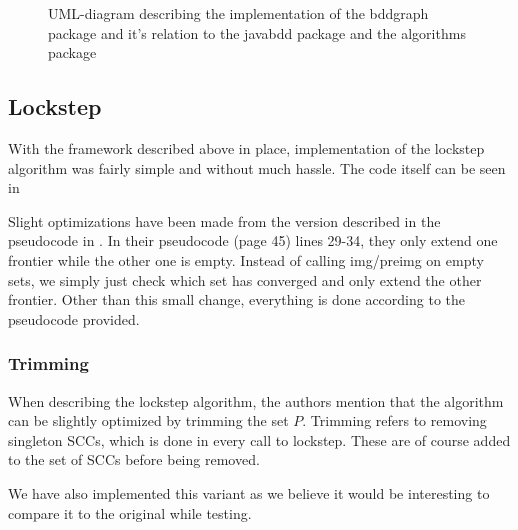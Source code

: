 \documentclass[../master/master.tex]{subfiles}
\begin{document}
\begin{figure}[h!]
\begin{center}
\end{center}
\caption{UML-diagram describing the implementation of the bddgraph package and it's relation to the javabdd package and the algorithms package}
\label{main_uml}
\end{figure}

\subsection{Lockstep}
With the framework described above in place, implementation of the lockstep algorithm was fairly simple and without much hassle. The code itself can be seen in 

Slight optimizations have been made from the version described in the pseudocode in \cite{lockstep}. In their pseudocode (page 45) lines 29-34, they only extend one frontier while the other one is empty. Instead of calling img/preimg on empty sets, we simply just check which set has converged and only extend the other frontier. Other than this small change, everything is done according to the pseudocode provided. 

\subsubsection*{Trimming}
When describing the lockstep algorithm\cite{lockstep}, the authors mention that the algorithm can be slightly optimized by trimming the set $P$. Trimming refers to removing singleton SCCs, which is done in every call to lockstep. These are of course added to the set of SCCs before being removed.

We have also implemented this variant as we believe it would be interesting to compare it to the original while testing. 
\end{document}

